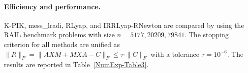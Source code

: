 \documentclass[11pt]{article}
\numberwithin{equation}{section}
\begin{document}




\paragraph{Efficiency and performance.}
K-PIK, mess\_lradi, RLyap, and IRRLyap-RNewton are compared by using the RAIL benchmark problems with size $n=5177,20209,79841$. The stopping criterion for all methods are unified as $\|R\|_F=\|AXM+MXA - C\|_F  \le \tau \cdot \|C\|_F$ with a tolerance $\tau = 10^{-6}$. 
The results are reported in Table~\ref{NumExp-Table3}.

\end{document}
